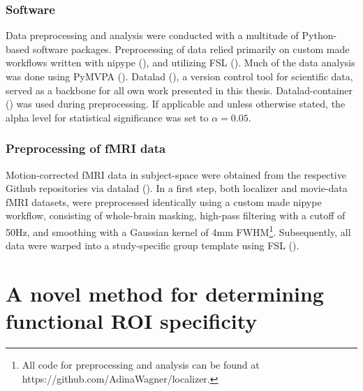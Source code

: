 \documentclass[a4paper, 12pt]{scrreprt}
\begin{document}
\subsection{Software}
Data preprocessing and analysis were conducted with a multitude of Python-based software packages. Preprocessing of data relied primarily on custom made workflows written with nipype (\cite{gorgolewski_krzysztof}), and utilizing FSL (\cite{jenkinson2012fsl}). Much of the data analysis was done using PyMVPA (\cite{hanke2009pymvpa}). Datalad (\cite{visconti_di_oleggio_castello_matteo_2019_2560733}), a version control tool for scientific data, served as a backbone for all own work presented in this thesis. Datalad-container (\cite{michael_hanke_2018_2431915}) was used during preprocessing. If applicable and unless otherwise stated, the alpha level for statistical significance was set to $\alpha = 0.05$.

\subsection{Preprocessing of fMRI data}

Motion-corrected fMRI data in subject-space were obtained from the respective Github repositories via datalad (\cite{visconti_di_oleggio_castello_matteo_2019_2560733}). In a first step, both localizer and movie-data fMRI datasets, were preprocessed identically using a custom made nipype workflow, consisting of whole-brain masking, high-pass filtering with a cutoff of 50Hz, and smoothing with a Gaussian kernel of 4mm FWHM\footnote{All code for preprocessing and analysis can be found at https://github.com/AdinaWagner/localizer.}. Subsequently, all data were warped into a study-specific group template using FSL (\cite{jenkinson2012fsl}). 




\chapter{A novel method for determining functional ROI specificity}\label{c1}
\end{document}
